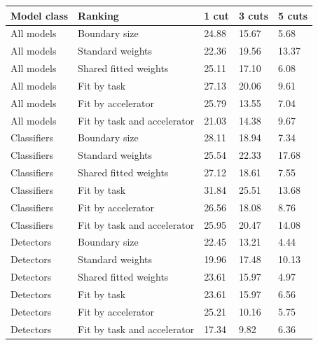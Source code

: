 \begin{tabular}{@{}lllll@{}}
\toprule
Model class & Ranking & 1 cut & 3 cuts & 5 cuts \\
\midrule
All models & Boundary size & 24.88 & 15.67 & 5.68 \\
All models & Standard weights & 22.36 & 19.56 & 13.37 \\
All models & Shared fitted weights & 25.11 & 17.10 & 6.08 \\
All models & Fit by task & 27.13 & 20.06 & 9.61 \\
All models & Fit by accelerator & 25.79 & 13.55 & 7.04 \\
All models & Fit by task and accelerator & 21.03 & 14.38 & 9.67 \\
Classifiers & Boundary size & 28.11 & 18.94 & 7.34 \\
Classifiers & Standard weights & 25.54 & 22.33 & 17.68 \\
Classifiers & Shared fitted weights & 27.12 & 18.61 & 7.55 \\
Classifiers & Fit by task & 31.84 & 25.51 & 13.68 \\
Classifiers & Fit by accelerator & 26.56 & 18.08 & 8.76 \\
Classifiers & Fit by task and accelerator & 25.95 & 20.47 & 14.08 \\
Detectors & Boundary size & 22.45 & 13.21 & 4.44 \\
Detectors & Standard weights & 19.96 & 17.48 & 10.13 \\
Detectors & Shared fitted weights & 23.61 & 15.97 & 4.97 \\
Detectors & Fit by task & 23.61 & 15.97 & 6.56 \\
Detectors & Fit by accelerator & 25.21 & 10.16 & 5.75 \\
Detectors & Fit by task and accelerator & 17.34 & 9.82 & 6.36 \\
\bottomrule
\end{tabular}
